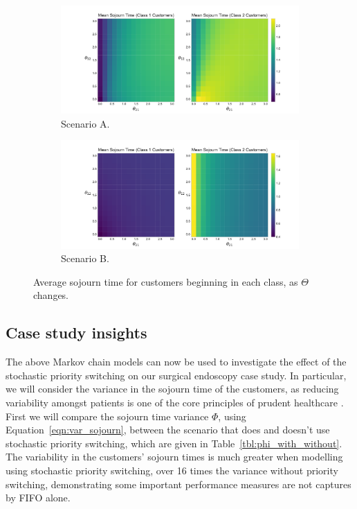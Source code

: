 \documentclass{article}
\begin{document}
\begin{figure}
  \begin{center}
  \begin{subfigure}[b]{0.49\textwidth}
    \includegraphics[width=\textwidth]{img/vary_thetas_sojourn_scen1.pdf}
    \caption{Scenario A.}
    \label{fig:sojourn_A}
  \end{subfigure}
  \begin{subfigure}[b]{0.49\textwidth}
    \includegraphics[width=\textwidth]{img/vary_thetas_sojourn_scen2.pdf}
    \caption{Scenario B.}
    \label{fig:sojourn_B}
  \end{subfigure}
  \caption{Average sojourn time for customers beginning in each class, as
  $\Theta$ changes.}
  \end{center}
\end{figure}


\subsection{Case study insights}
The above Markov chain models can now be used to investigate the effect of the
stochastic priority switching on our surgical endoscopy case study. In
particular, we will consider the variance in the sojourn time of the customers,
as reducing variability amongst patients is one of the core principles of
prudent healthcare \cite{prudent15}. First we will compare the sojourn time
variance $\Phi$, using Equation~\ref{eqn:var_sojourn}, between the scenario that
does and doesn't use stochastic priority switching, which are given in
Table~\ref{tbl:phi_with_without}. The variability in the customers' sojourn
times is much greater when modelling using stochastic priority switching, over
16 times the variance without priority switching, demonstrating some important
performance measures are not captures by FIFO alone.
\end{document}
